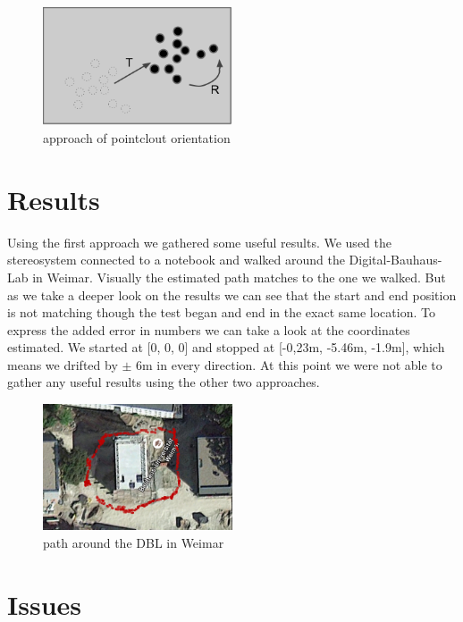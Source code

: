 \documentclass[11pt]{article}
\begin{document}
	\begin{figure}[H]
		\centering
		\includegraphics[width=0.5\textwidth]{images/pointcloud_orientation.png}
		\caption{approach of pointclout orientation}
	\end{figure}
	
	\section{Results}
	Using the first approach we gathered some useful results. We used the stereosystem connected to a notebook and walked around the Digital-Bauhaus-Lab in Weimar. Visually the estimated path matches to the one we walked. But as we take a deeper look on the results we can see that the start and end position is not matching though the test began and end in the exact same location. To express the added error in numbers we can take a look at the coordinates estimated. We started at [0, 0, 0] and stopped at [-0,23m, -5.46m, -1.9m], which means we drifted by $\pm$ 6m in every direction. At this point we were not able to gather any useful results using the other two approaches.
	
	\begin{figure}[H]
		\centering
		\includegraphics[width=0.5\textwidth]{images/result.jpg}
		\caption{path around the DBL in Weimar}
	\end{figure}

	\section{Issues}
\end{document}
